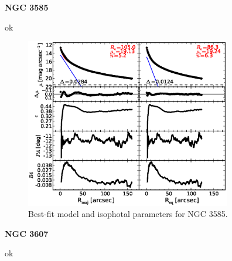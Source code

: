 \documentclass[preprint2]{emulateapj}
\newcommand{\fitfigurewidth}{0.8\textwidth}
\begin{document}
  \clearpage\newpage\noindent

  {\bf NGC 3585 \\}

  ok

  \begin{figure}[h]
  \begin{center}
  \includegraphics[width=\fitfigurewidth]{images/n3585_1Dfit.eps}
  \caption{Best-fit model and isophotal parameters for NGC 3585.}
  \end{center}
  \end{figure}


  \clearpage\newpage\noindent

  {\bf NGC 3607 \\}

  ok
\end{document}
